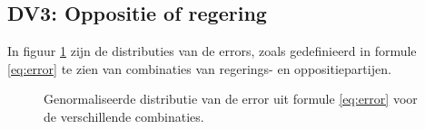 \subsection{DV3: Oppositie of regering}
In figuur \ref{fig:distributies} zijn de distributies van de errors, zoals gedefinieerd in formule \ref{eq:error} te zien van combinaties van regerings- en oppositiepartijen.
\begin{figure}[H]
    \centering
    \hspace*{-0.2in}
    \quad
    \hspace*{-0.2in}
    \quad
    \caption{Genormaliseerde distributie van de error uit formule \ref{eq:error} voor de verschillende combinaties.}%
    \label{fig:distributies}%
\end{figure}
